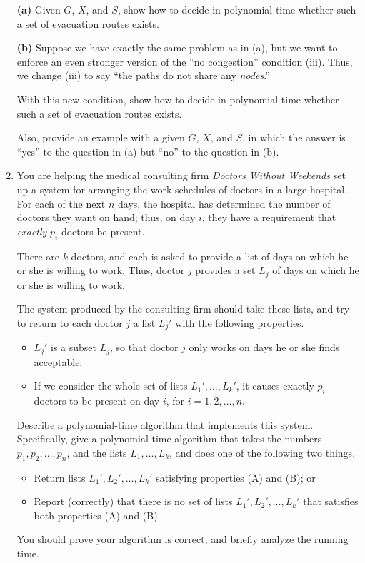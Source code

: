 \documentclass[12pt]{article}
\begin{document}
\begin{enumerate}
{\bf (a)} Given $G$, $X$, and $S$, show how to decide in
polynomial time whether such a set of evacuation routes exists.

\vskip 0.1in
{\bf (b)} Suppose we have exactly the same problem as in (a),
but we want to enforce an even stronger version of
the ``no congestion'' condition (iii).
Thus, we change (iii) to say
``the paths do not share any {\em nodes}.''

With this new condition, show how to decide in
polynomial time whether such a set of evacuation routes exists.

Also, provide an example with a given $G$, $X$, and $S$, in which
the answer is ``yes'' to the question in (a) but ``no''
to the question in (b).





\item 

You are helping the medical consulting firm
{\em Doctors Without Weekends} set up a system
for arranging the work schedules of doctors in a large hospital.
For each of the next $n$ days, the hospital has
determined the number of doctors they want on hand;
thus, on day $i$, they have a requirement that
{\em exactly} $p_i$ doctors be present.

There are $k$ doctors, and each is asked to provide
a list of days on which he or she is willing to work.
Thus, doctor $j$ provides a set $L_j$ of days
on which he or she is willing to work.

The system produced by the consulting firm should
take these lists, %
and try to return to each doctor $j$ a
list $L_j'$ with the following properties.
\begin{itemize}
\item[(A)] $L_j'$ is a subset $L_j$, so that doctor $j$
only works on days he or she finds acceptable.
\item[(B)] If we consider the whole set of lists $L_1', \ldots, L_k'$,
it causes exactly $p_i$ doctors to be present on day $i$,
for $i = 1, 2, \ldots, n$.
\end{itemize}

\bigskip
{} 
Describe a polynomial-time algorithm that implements
this system.
Specifically, give a polynomial-time algorithm that takes the
numbers $p_1, p_2, \ldots, p_n$,
and the lists $L_1, \ldots, L_k$,
and does one of the following two things.
\begin{itemize}
\item Return lists $L_1', L_2', \ldots, L_k'$
satisfying properties (A) and (B); or
\item Report (correctly) that there is no
set of lists $L_1', L_2', \ldots, L_k'$
that satisfies both properties (A) and (B).
\end{itemize}
You should prove your algorithm is correct, and
briefly analyze the running time.


\end{enumerate}
\end{document}
